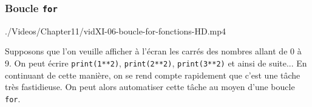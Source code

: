 \subsubsection[Boucle {\normalfont\texttt{for}}]{Boucle {\normalfont\texttt{for}}}
\label{subsub:XI.3.2.1}

\begin{marginvideo}
		{./Videos/Chapter11/vidXI-06-boucle-for-fonctions-HD.mp4}%
\end{marginvideo}

Supposons que l'on veuille afficher à l'écran les carrés des nombres allant de 0 à 9. On peut écrire \texttt{print(1**2)}, \texttt{print(2**2)}, \texttt{print(3**2)} et ainsi de suite... En continuant de cette manière, on se rend compte rapidement que c'est une tâche très fastidieuse. On peut alors automatiser cette tâche au moyen d'une boucle \texttt{for}.


